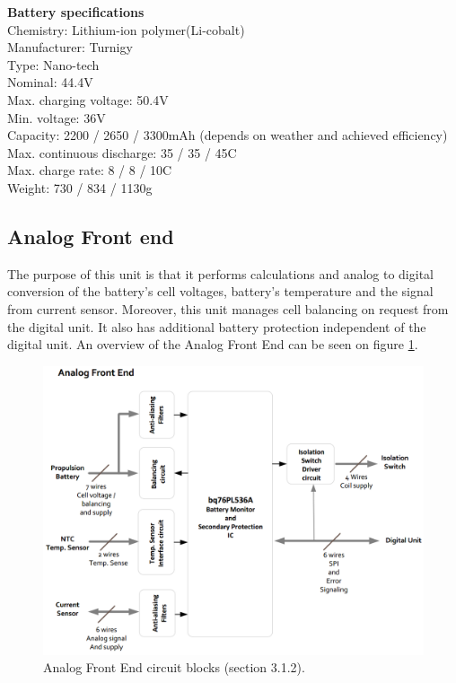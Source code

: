 \textbf{Battery specifications}\\
Chemistry: Lithium-ion polymer(Li-cobalt)\\
Manufacturer: Turnigy\\
Type: Nano-tech\\
Nominal: 44.4V\\
Max. charging voltage: 50.4V\\
Min. voltage: 36V\\
Capacity: 2200 / 2650 / 3300mAh (depends on weather and achieved efficiency)\\
Max. continuous discharge: 35 / 35 / 45C\\
Max. charge rate: 8 / 8 / 10C\\
Weight: 730 / 834 / 1130g\\

\subsection{Analog Front end}
The purpose of this unit is that it performs calculations and analog to digital conversion of the battery's cell voltages, battery's temperature and the signal from current sensor. Moreover, this unit manages cell balancing on request from the digital unit. It also has additional battery protection independent of the digital unit.
An overview of the Analog Front End can be seen on figure \ref{fig:frontendOverview}.

\begin{figure}[H]
	\centering
	\includegraphics[width=1.0\linewidth]{Hardware/Pictures/analogfrontendOverview}
	\caption[Empty]{Analog Front End circuit blocks \cite{BMSDocumentation} (section 3.1.2).}
	\label{fig:frontendOverview}
\end{figure}

